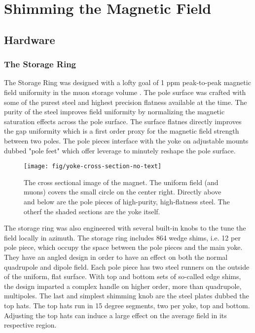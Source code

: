 \chapter {Shimming the Magnetic Field} \label{ch:shimming}

\section{Hardware}

\subsection{The Storage Ring}

The \gmtwo Storage Ring was designed with a lofty goal of 1 ppm peak-to-peak magnetic field uniformity in the muon storage volume .  The pole surface was crafted with some of the purest steel and highest precision flatness available at the time. The purity of the steel improves field uniformity by normalizing the magnetic saturation effects across the pole surface.  The surface flatnes directly improves the gap uniformity which is a first order proxy for the magnetic field strength between two poles. The pole pieces interface with the yoke on adjustable mounts dubbed "pole feet" which offer leverage to minutely reshape the pole surface.

\begin{figure}
\label{fig:yoke-cross-section-no-text}
\centering
\texttt{[image: fig/yoke-cross-section-no-text]}
\caption{The cross sectional image of the magnet.  The uniform field (and muons) covers the small circle on the center right.  Directly above and below are the pole pieces of high-purity, high-flatness steel.  The otherf the shaded sections are the yoke itself.}
\end{figure}

The storage ring was also engineered with several built-in knobs to the tune the field locally in azimuth.  The storage ring includes 864 wedge shims, i.e. 12 per pole piece, which occupy the space between the pole pieces and the main yoke.  They have an angled design in order to have an effect on both the normal quadrupole and dipole field.  Each pole piece has two steel runners on the outside of the uniform, flat surface.  With top and bottom sets of so-called edge shims, the design imparted a complex handle on higher order, more than quadrupole, multipoles. The last and simplest shimming knob are the steel plates dubbed the top hats.  The top hats run in 15 degree segments, two per yoke, top and bottom.  Adjusting the top hats can induce a large effect on the average field in its respective region.  


